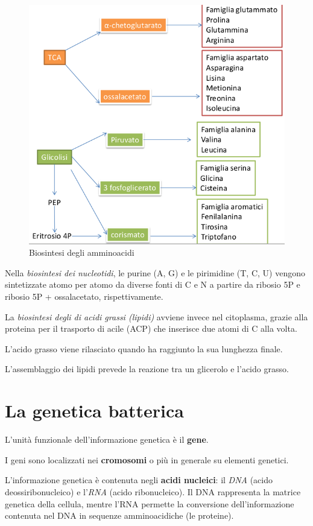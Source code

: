 \documentclass[11pt]{book}
\begin{document}
\begin{figure}[htp]
\centering
\includegraphics[scale=0.5]{img/Biosintesi a.a..png}
\caption{Biosintesi degli amminoacidi}
\label{}
\end{figure}

Nella \emph{biosintesi dei nucleotidi}, le purine (A, G) e le pirimidine (T, C, U) vengono sintetizzate atomo per atomo da diverse fonti di C e N a partire da ribosio 5P e ribosio 5P + ossalacetato, rispettivamente.
 
La \emph{biosintesi degli di acidi grassi (lipidi)} avviene invece nel citoplasma, grazie alla proteina per il trasporto di acile (ACP) che inserisce due atomi di C alla volta. 

L’acido grasso viene rilasciato quando ha raggiunto la sua lunghezza finale.

L'assemblaggio dei lipidi prevede la reazione tra un glicerolo e l’acido grasso.

\chapter{La genetica batterica}

L’unità funzionale dell’informazione genetica è il \textbf{gene}. 

I geni sono localizzati nei \textbf{cromosomi} o più in generale su elementi genetici.

L’informazione genetica è contenuta negli \textbf{acidi nucleici}: il \emph{DNA} (acido deossiribonucleico) e l’\emph{RNA} (acido ribonucleico).
Il DNA rappresenta la matrice genetica della cellula, mentre l’RNA permette la conversione dell’informazione contenuta nel DNA in sequenze amminoacidiche (le proteine).
\end{document}
